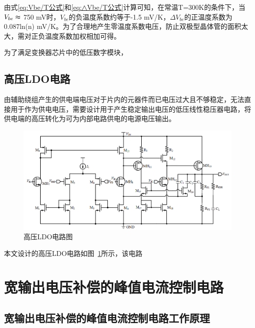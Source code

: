 由式\eqref{eq:Vbe/T公式}和\eqref{eq:△Vbe/T公式}计算可知，在常温T=300K的条件下，当$V_{be}\thickapprox $ 750 mV时，$V_{be}$的负温度系数约等于-1.5 mV/K，$\varDelta V_{be}$的正温度系数为0.087ln(n) mV/K。为了合理地产生零温度系数电压，防止双极型晶体管的面积太大，需对正负温度系数加权相加可得。

为了满足变换器芯片中的低压数字模块，



\subsection{高压LDO电路}

由辅助绕组产生的供电端电压对于片内的元器件而已电压过大且不够稳定，无法直接用于作为供电电压，需要设计用于产生稳定输出电压的低压线性稳压器电路，将供电端的高压转化为可为内部电路供电的电源电压输出。
\begin{figure}[htbp] 
    \centering
    \includegraphics[width=0.6\linewidth]{figures/高压LDO.png}
    \caption{高压LDO电路图}
    \label{fig:高压LDO}
\end{figure}

本文设计的高压LDO电路如图~\ref{fig:高压LDO}所示，该电路





\section{宽输出电压补偿的峰值电流控制电路}
\label{sec:峰值电流控制电路}
\subsection{宽输出电压补偿的峰值电流控制电路工作原理}

